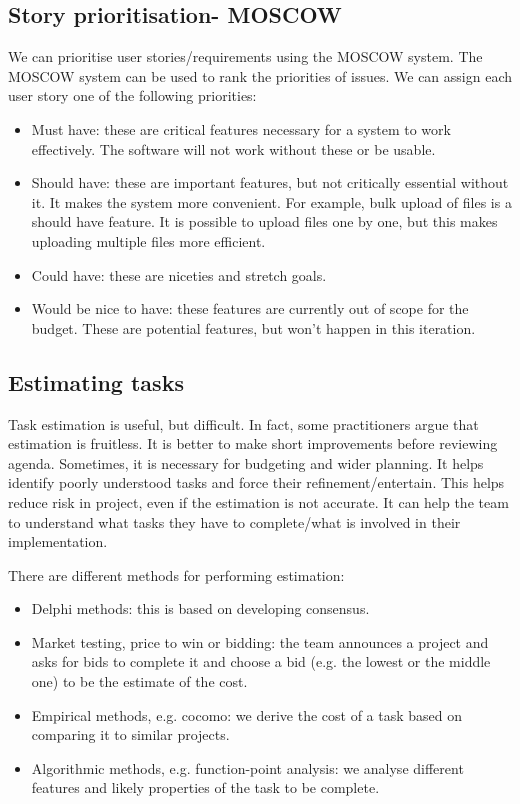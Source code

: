 \documentclass[a4paper, openany]{memoir}
\begin{document}
\subsection{Story prioritisation- MOSCOW}
We can prioritise user stories/requirements using the MOSCOW system. The MOSCOW system can be used to rank the priorities of issues. We can assign each user story one of the following priorities:
\begin{itemize}
    \item Must have: these are critical features necessary for a system to work effectively. The software will not work without these or be usable.
    \item Should have: these are important features, but not critically essential without it. It makes the system more convenient. For example, bulk upload of files is a should have feature. It is possible to upload files one by one, but this makes uploading multiple files more efficient.
    \item Could have: these are niceties and stretch goals.
    \item Would be nice to have: these features are currently out of scope for the budget. These are potential features, but won't happen in this iteration.
\end{itemize}

\subsection{Estimating tasks}
Task estimation is useful, but difficult. In fact, some practitioners argue that estimation is fruitless. It is better to make short improvements before reviewing agenda. Sometimes, it is necessary for budgeting and wider planning. It helps identify poorly understood tasks and force their refinement/entertain. This helps reduce risk in project, even if the estimation is not accurate. It can help the team to understand what tasks they have to complete/what is involved in their implementation.

There are different methods for performing estimation:
\begin{itemize}
    \item Delphi methods: this is based on developing consensus.
    \item Market testing, price to win or bidding: the team announces a project and asks for bids to complete it and choose a bid (e.g. the lowest or the middle one) to be the estimate of the cost.
    \item Empirical methods, e.g. cocomo: we derive the cost of a task based on comparing it to similar projects.
    \item Algorithmic methods, e.g. function-point analysis: we analyse different features and likely properties of the task to be complete.
\end{itemize}
\end{document}
